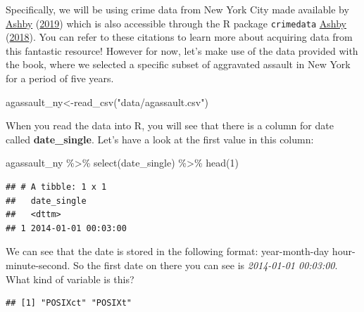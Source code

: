 \documentclass[
]{book}
\makeatletter
\newenvironment{Shaded}{\begin{snugshade}}{\end{snugshade}}
\newcommand{\DecValTok}[1]{\textcolor[rgb]{0.06,0.06,0.06}{#1}}
\newcommand{\FunctionTok}[1]{\textcolor[rgb]{0,0,0}{#1}}
\newcommand{\NormalTok}[1]{#1}
\newcommand{\OtherTok}[1]{\textcolor[rgb]{0.37,0.37,0.37}{#1}}
\newcommand{\SpecialCharTok}[1]{\textcolor[rgb]{0,0,0}{#1}}
\newcommand{\StringTok}[1]{\textcolor[rgb]{0.5,0.5,0.5}{#1}}
\newenvironment{kframe}{%
\medskip{}
\setlength{\fboxsep}{.8em}
 \def\at@end@of@kframe{}%
 \ifinner\ifhmode%
  \def\at@end@of@kframe{\end{minipage}}%
  \begin{minipage}{\columnwidth}%
 \fi\fi%
 \def\FrameCommand##1{\hskip\@totalleftmargin \hskip-\fboxsep
 \colorbox{shadecolor}{##1}\hskip-\fboxsep
     \hskip-\linewidth \hskip-\@totalleftmargin \hskip\columnwidth}%
 \MakeFramed {\advance\hsize-\width
   \@totalleftmargin\z@ \linewidth\hsize
   \@setminipage}}%
 {\par\unskip\endMakeFramed%
 \at@end@of@kframe}
\renewenvironment{Shaded}{\begin{kframe}}{\end{kframe}}
\makeatother
\begin{document}
Specifically, we will be using crime data from New York City made available by \protect\hyperlink{ref-Ashby_2019}{Ashby} (\protect\hyperlink{ref-Ashby_2019}{2019}) which is also accessible through the R package \texttt{crimedata} \protect\hyperlink{ref-Ashby_2018}{Ashby} (\protect\hyperlink{ref-Ashby_2018}{2018}). You can refer to these citations to learn more about acquiring data from this fantastic resource! However for now, let's make use of the data provided with the book, where we selected a specific subset of aggravated assault in New York for a period of five years.

\begin{Shaded}
\begin{Highlighting}[]
\NormalTok{agassault\_ny}\OtherTok{\textless{}{-}}\FunctionTok{read\_csv}\NormalTok{(}\StringTok{"data/agassault.csv"}\NormalTok{)}
\end{Highlighting}
\end{Shaded}

When you read the data into R, you will see that there is a column for date called \textbf{date\_single}. Let's have a look at the first value in this column:

\begin{Shaded}
\begin{Highlighting}[]
\NormalTok{agassault\_ny }\SpecialCharTok{\%\textgreater{}\%} 
  \FunctionTok{select}\NormalTok{(date\_single) }\SpecialCharTok{\%\textgreater{}\%} 
  \FunctionTok{head}\NormalTok{(}\DecValTok{1}\NormalTok{)}
\end{Highlighting}
\end{Shaded}

\begin{verbatim}
## # A tibble: 1 x 1
##   date_single        
##   <dttm>             
## 1 2014-01-01 00:03:00
\end{verbatim}

We can see that the date is stored in the following format: year-month-day hour-minute-second. So the first date on there you can see is \emph{2014-01-01 00:03:00}. What kind of variable is this?

\begin{Shaded}
\end{Shaded}

\begin{verbatim}
## [1] "POSIXct" "POSIXt"
\end{verbatim}
\end{document}
